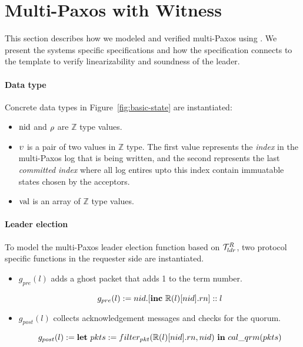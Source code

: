 \vspace{-0.7em}

\section{Multi-Paxos with Witness}
\label{sec:multipaxos-with-witness}

This section describes how we modeled and verified multi-Paxos using 
\sysname{}. We present the systems specific specifications and how the
specification connects to the template to verify linearizability and soundness
of the leader. 

\paragraph{Data type}
Concrete data types in Figure~\ref{fig:basic-state} are instantiated:
\begin{itemize}[leftmargin=*]
\item $\mathrm{nid}$ and $\rho$ are $\mathbb{Z}$ type values.
\item $\upsilon$ is a pair of two values in $\mathbb{Z}$ type. The first value represents 
the \textit{index} in the multi-Paxos log that is being written, and the 
second represents the last \textit{committed index} where all log entires upto this
index contain immuatable states chosen by the acceptors.
\item $\mathrm{val}$ is an array of $\mathbb{Z}$ type values.
\vspace{-0.2em}
\end{itemize}

\paragraph{Leader election}
To model the multi-Paxos leader election function based on $\mathcal{T}^{R}_{ldr}$,
two protocol specific functions in the requester side are instantiated.
\begin{itemize}[leftmargin=*]
\item $g_{pre} (l)$ adds a ghost packet that adds 1 to the term number.
\begin{small}
$$g_{pre} (l) := nid.[\mbox{\textbf{inc}} \ \mathbb{R}(l)[nid].rn]::l$$
\end{small}
\item $g_{post} (l)$ collects acknowledgement messages and checks for the
	quorum.
\begin{small}
\vspace{-0.2em}
$$g_{post} (l) := \mbox{\textbf{let}}\ pkts := filter_{pkt}(\replay(l)[nid].rn, nid)\ \mbox{\textbf{in}} \ cal\_qrm(pkts)$$
\end{small}
\vspace{-0.3em}
\end{itemize}

